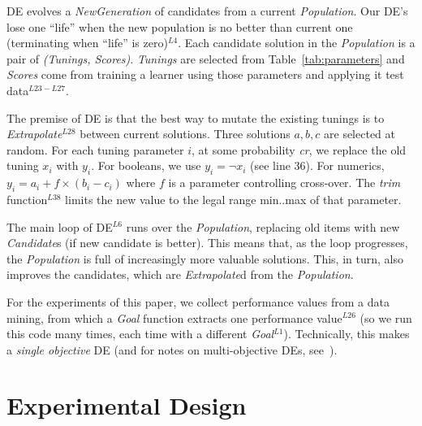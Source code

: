 \documentclass[smallextended]{svjour3}
\newcommand{\tab}[1]{Table~\ref{tab:#1}}
\begin{document}
DE evolves a {\em NewGeneration} of candidates  from
a current {\em Population}.  Our DE's lose one ``life''
when the new population is no better than  current one (terminating when ``life'' is zero)$^{L4}$.
Each candidate solution in the {\em Population}  
is a pair of {\em (Tunings, Scores)}.  {\em Tunings} are selected from
\tab{parameters} and {\em Scores} come from training a learner using those parameters
and applying it     test data$^{L23-L27}$.

The premise of DE  is that the best way to mutate the existing tunings
is to {\em Extrapolate}$^{L28}$
between current solutions.  Three solutions $a,b,c$ are selected at random.
For each tuning parameter $i$, at some probability {\em cr}, we replace
the old tuning $x_i$ with $y_i$. For booleans, we use $y_i= \neg x_i$ (see line 36). For numerics, $y_i = a_i+f \times (b_i - c_i)$   where $f$ is a parameter
controlling  cross-over.  The {\em trim} function$^{L38}$ limits the new
value to the legal range min..max of that parameter.
 
The main loop of DE$^{L6}$ runs over the {\em Population}, replacing old items
with new {\em Candidate}s (if  new candidate is better).
This means that, as the loop progresses, the {\em Population} is full of increasingly
more valuable solutions. This, in turn, also improves  the candidates, which are {\em Extrapolate}d
from the {\em Population}.

For the experiments of this paper, we collect performance
values from a data mining, from which a {\em Goal} function extracts one 
performance value$^{L26}$ (so we run this code many times, each time with
a different {\em Goal}$^{L1}$).  Technically, this makes a  {\em single objective} DE (and for notes on multi-objective DEs, see~\cite{Coello05,zhang07,5583335}).






\section{Experimental Design}\label{sect:design}
 
\end{document}
